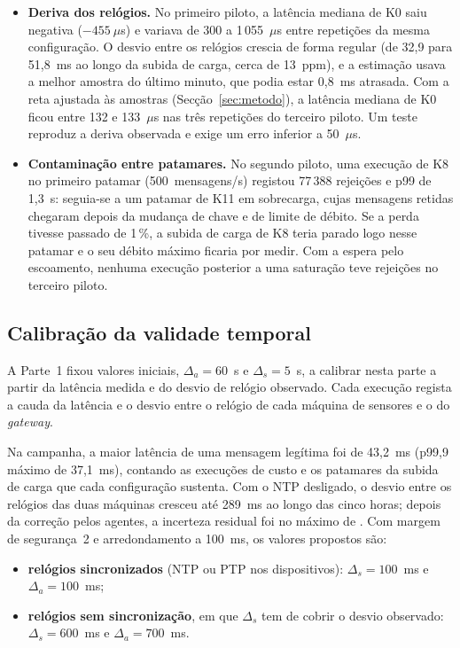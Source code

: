 \begin{itemize}[leftmargin=*]
  \item \textbf{Deriva dos relógios.} No primeiro piloto, a latência mediana de K0
    saiu negativa ($-455~\mu$s) e variava de 300 a 1\,055~$\mu$s entre repetições
    da mesma configuração. O desvio entre os relógios crescia de forma regular
    (de 32,9 para 51,8~ms ao longo da subida de carga, cerca de 13~ppm), e a
    estimação usava a melhor amostra do último minuto, que podia estar 0,8~ms
    atrasada. Com a reta ajustada às amostras
    (Secção~\ref{sec:metodo}), a latência mediana de K0 ficou entre 132 e
    133~$\mu$s nas três repetições do terceiro piloto. Um teste reproduz a
    deriva observada e exige um erro inferior a 50~$\mu$s.
  \item \textbf{Contaminação entre patamares.} No segundo piloto, uma execução
    de K8 no primeiro patamar (500~mensagens/s) registou 77\,388 rejeições e p99
    de 1,3~s: seguia-se a um patamar de K11 em sobrecarga, cujas mensagens retidas
    chegaram depois da mudança de chave e de limite de débito. Se a perda tivesse
    passado de 1\,\%, a subida de carga de K8 teria parado logo nesse patamar e o
    seu débito máximo ficaria por medir. Com a espera
    pelo escoamento, nenhuma execução posterior a uma saturação teve rejeições no
    terceiro piloto.
\end{itemize}

\subsection{Calibração da validade temporal}

A Parte~1 fixou valores iniciais, $\Delta_a = 60$~s e $\Delta_s = 5$~s, a calibrar
nesta parte a partir da latência medida e do desvio de relógio observado. Cada
execução regista a cauda da latência e o desvio entre o relógio de cada máquina de
sensores e o do \emph{gateway}.

Na campanha, a maior latência de uma mensagem legítima foi de 43,2~ms (p99,9
máximo de 37,1~ms), contando as execuções de custo e os patamares da subida de
carga que cada configuração sustenta. Com o NTP desligado, o desvio entre os
relógios das duas máquinas cresceu até 289~ms ao longo das cinco horas; depois da
correção pelos agentes, a incerteza residual foi no máximo de . Com margem
de segurança~2 e arredondamento a 100~ms, os valores propostos são:

\begin{itemize}[leftmargin=*]
  \item \textbf{relógios sincronizados} (NTP ou PTP nos dispositivos):
    $\Delta_s = 100$~ms e $\Delta_a = 100$~ms;
  \item \textbf{relógios sem sincronização}, em que $\Delta_s$ tem de cobrir o
    desvio observado: $\Delta_s = 600$~ms e $\Delta_a = 700$~ms.
\end{itemize}

